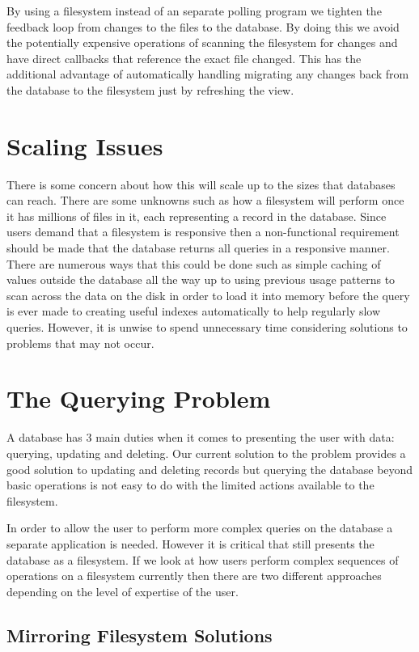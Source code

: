 By using a filesystem instead of an separate polling program we tighten the feedback loop from changes to the files to the database. By doing this we avoid the potentially expensive operations of scanning the filesystem for changes and have direct callbacks that reference the exact file changed. This has the additional advantage of automatically handling migrating any changes back from the database to the filesystem just by refreshing the view.

\section{Scaling Issues}

There is some concern about how this will scale up to the sizes that databases can reach. There are some unknowns such as how a filesystem will perform once it has millions of files in it, each representing a record in the database. Since users demand that a filesystem is responsive then a non-functional requirement should be made that the database returns all queries in a responsive manner. There are numerous ways that this could be done such as simple caching of values outside the database all the way up to using previous usage patterns to scan across the data on the disk in order to load it into memory before the query is ever made to creating useful indexes automatically to help regularly slow queries. However, it is unwise to spend unnecessary time considering solutions to problems that may not occur.

\section{The Querying Problem}

A database has 3 main duties when it comes to presenting the user with data: querying, updating and deleting. Our current solution to the problem provides a good solution to updating and deleting records but querying the database beyond basic operations is not easy to do with the limited actions available to the filesystem.

In order to allow the user to perform more complex queries on the database a separate application is needed. However it is critical that still presents the database as a filesystem. If we look at how users perform complex sequences of operations on a filesystem currently then there are two different approaches depending on the level of expertise of the user.

\subsection{Mirroring Filesystem Solutions}

